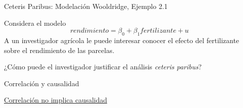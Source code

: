 \documentclass[11pt,handout]{beamer}
\begin{document}


\begin{frame}{Ceteris Paribus: Modelación}
{Wooldridge, Ejemplo 2.1}

\pause 
Considera el modelo
\[
	rendimiento = \beta_0 + \beta_1 fertilizante + u
\]
\pause 
A un investigador agr\'icola le puede interesar conocer el efecto del fertilizante sobre el rendimiento de las parcelas. 

¿Cómo puede el investigador justificar el análisis \emph{ceteris paribus}?

\pause \vspace{.25cm}
\end{frame}

\begin{frame}{Correlación y causalidad}

\textcolor{blue}{\href{http://tylervigen.com/}{Correlación no implica causalidad}}

\end{frame}
\end{document}
